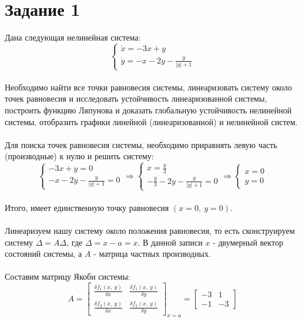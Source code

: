 \documentclass[12pt]{article}
\begin{document}
\section*{Задание 1}
Дана следующая нелинейная система:
\[
\begin{cases}
    \dot{x} = -3x + y\\
    \dot{y} = -x - 2y - \frac{y}{|y| + 1}
\end{cases}
\]\\
Необходимо найти все точки равновесия системы, линеаризовать систему около точек равновесия и исследовать устойчивость линеаризованной системы, построить функцию Ляпунова и доказать глобальную устойчивость нелинейной системы, отобразить графики линейной (линеаризованной) и нелинейной систем.\\
\ \\
Для поиска точек равновесия системы, необходимо приравнять левую часть (производные) к нулю и решить систему:
\[
\begin{cases}
    -3x + y = 0\\
    -x - 2y - \frac{y}{|y| + 1} = 0
\end{cases}
\Rightarrow
\begin{cases}
    x = \frac{y}{3}\\
    -\frac{y}{3} - 2y - \frac{y}{|y| + 1} = 0
\end{cases}
\Rightarrow
\begin{cases}
    x = 0\\
    y = 0
\end{cases}
\]\\
Итого, имеет единственную точку равновесия $(x=0,\ y=0)$.\\
\ \\
Линеаризуем нашу систему около положения равновесия, то есть сконструируем систему $\dot{\Delta} = A\Delta$, где $\Delta = x - a = x$. В данной записи $x$ - двумерный вектор состояний системы, а $A$ - матрица частных производных.\\
\ \\
Составим матрицу Якоби системы:
\[
    A = \begin{bmatrix}
\frac{\delta f_1(x,\ y)}{\delta x} & \frac{\delta f_1(x,\ y)}{\delta y}\\
\frac{\delta f_2(x,\ y)}{\delta x} & \frac{\delta f_2(x,\ y)}{\delta y}
\end{bmatrix}_{x=a} = 
\begin{bmatrix}
-3 & 1\\
-1 & -3
\end{bmatrix}
\]
\end{document}
